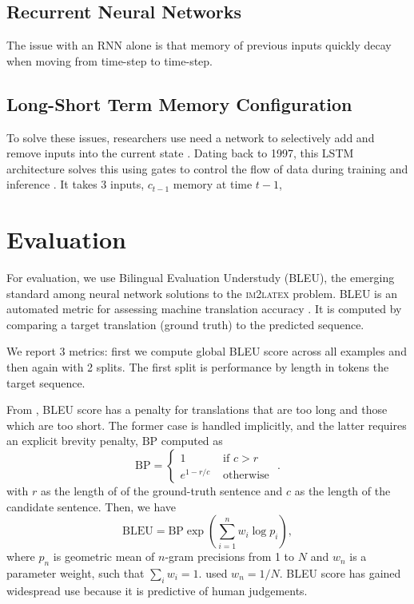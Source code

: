\documentclass{article}
\begin{document}
\subsection{Recurrent Neural Networks}

The issue with an RNN alone is that memory of previous inputs quickly decay when
moving from time-step to time-step. 

\subsection{Long-Short Term Memory Configuration}

To solve these issues, researchers use need a network to selectively add and
remove inputs into the current state \parencite{zhang2019dive}. Dating back to
1997, this LSTM architecture solves this using gates to control the flow of data
during training and inference \parencite{zhang2019dive}. It takes 3 inputs,
$c_{t-1}$ memory at time $t-1$, 


\section{Evaluation}

For evaluation, we use Bilingual Evaluation Understudy (BLEU), the emerging
standard among neural network solutions to the \textsc{im2latex} problem. BLEU
is an automated metric for assessing machine translation accuracy
\cite[1]{papineni2002bleu}. It is computed by comparing a target translation
(ground truth) to the predicted sequence.

We report 3 metrics: first we compute global BLEU score across all examples and
then again with 2 splits. The first split is performance by length in tokens the
target sequence.

From \citeauthor{papineni2002bleu}, BLEU score has a penalty for translations
that are too long and those which are too short. The former case is handled
implicitly, and the latter requires an explicit brevity penalty, $\text{BP}$
computed as
\begin{equation}
 \text{BP} = \begin{cases}1 &\text{ if } c>r \\
  e^{1-r/c} &\text{ otherwise }\end{cases}.
\end{equation}
with $r$ as the length of of the ground-truth sentence and $c$ as the length of
the candidate sentence. Then, we have 
\begin{equation}
  \text{BLEU} = \text{BP} \exp\left( \sum_{i=1}^n w_i \log p_i \right),
\end{equation}
where $p_n$ is geometric mean of $n$-gram precisions from 1 to $N$ and $w_n$ is
a parameter weight, such that $\sum_i w_i = 1$. \citeauthor{papineni2002bleu}
used $w_n = 1/N$. BLEU score has gained widespread use because it is predictive
of human judgements.
\end{document}
